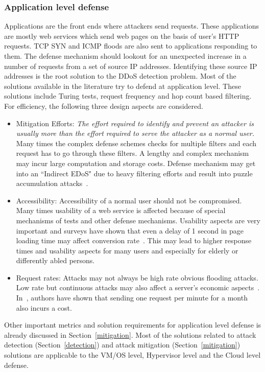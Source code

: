 \documentclass[final,5p,times,twocolumn]{elsarticle}
\begin{document}
\subsubsection{Application level defense}
Applications are the front ends where attackers send requests. These applications are mostly web services which send web pages on the basis of user's HTTP requests. TCP SYN and ICMP floods are also sent to applications responding to them. The defense mechanism should lookout for an unexpected increase in a number of requests from a set of source IP addresses. Identifying these source IP addresses is the root solution to the DDoS detection problem. Most of the solutions available in the literature try to defend at application level\cite{spow}\cite{edosshield}. These solutions include Turing tests, request frequency and hop count based filtering. For efficiency, the following three design aspects are considered. 
\begin{itemize}
\item Mitigation Efforts: {\it The effort required to identify and prevent an attacker is usually more than the effort required to serve the attacker as a normal user.} Many times the complex defense schemes checks for multiple filters and each request has to go through these filters. A lengthy and complex mechanism may incur large computation and storage costs. Defense mechanism may get into an ``Indirect EDoS" due to heavy filtering efforts and result into puzzle accumulation attacks~\cite{toolsdown}. 
\item Accessibility: Accessibility of a normal user should not be compromised. Many times usability of a web service is affected because of special mechanisms of tests and other defense mechanisms. Usability aspects are very important and surveys have shown that even a delay of 1 second in page loading time may affect conversion rate~\cite{conversion}. This may lead to higher response times and usability aspects for many users and especially for elderly or differently abled persons. 
\item Request rates: Attacks may not always be high rate obvious flooding attacks. Low rate but continuous attacks may also affect a server's economic aspects~\cite{Idziorek11}. In~\cite{Idziorek11}, authors have shown that sending one request per minute for a month also incurs a cost.
\end{itemize}
{Other important metrics and solution requirements for application level defense is already discussed in Section~\ref{mitigation}. Most of the solutions related to attack detection (Section~\ref{detection}) and attack mitigation (Section~\ref{mitigation}) solutions are applicable to the VM/OS level, Hypervisor level and the Cloud level defense. }
\end{document}
